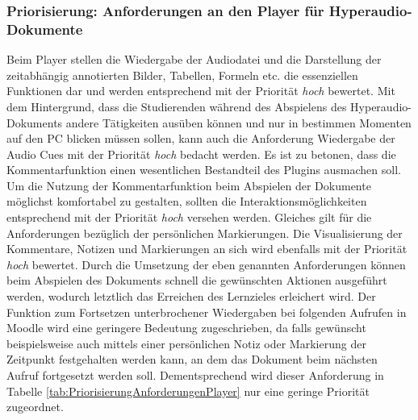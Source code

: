 \subsubsection{Priorisierung: Anforderungen an den Player für Hyperaudio-Dokumente}
Beim Player stellen die Wiedergabe der Audiodatei und die Darstellung der zeitabhängig annotierten Bilder, Tabellen, Formeln etc. die essenziellen Funktionen dar und werden entsprechend mit der Priorität \textit{hoch} bewertet. Mit dem Hintergrund, dass die Studierenden während des Abspielens des Hyperaudio-Dokuments andere Tätigkeiten ausüben können und nur in bestimmen Momenten auf den PC blicken müssen sollen, kann auch die Anforderung \glqq Wiedergabe der Audio Cues\grqq{} mit der Priorität \textit{hoch} bedacht werden. Es ist zu betonen, dass die Kommentarfunktion einen wesentlichen Bestandteil des Plugins ausmachen soll. Um die Nutzung der Kommentarfunktion beim Abspielen der Dokumente möglichst komfortabel zu gestalten, sollten die Interaktionsmöglichkeiten entsprechend mit der Priorität \textit{hoch} versehen werden. Gleiches gilt für die Anforderungen bezüglich der persönlichen Markierungen. Die Visualisierung der Kommentare, Notizen und Markierungen an sich wird ebenfalls mit der Priorität \textit{hoch} bewertet.
Durch die Umsetzung der eben genannten Anforderungen können beim Abspielen des Dokuments schnell die gewünschten Aktionen ausgeführt werden, wodurch letztlich das Erreichen des Lernzieles erleichert wird.
Der Funktion zum Fortsetzen unterbrochener Wiedergaben bei folgenden Aufrufen in Moodle wird eine geringere Bedeutung zugeschrieben, da falls gewünscht beispielsweise auch mittels einer persönlichen Notiz oder Markierung der Zeitpunkt festgehalten werden kann, an dem das Dokument beim nächsten Aufruf fortgesetzt werden soll. Dementsprechend wird dieser Anforderung in Tabelle \ref{tab:PriorisierungAnforderungenPlayer} nur eine geringe Priorität zugeordnet.

